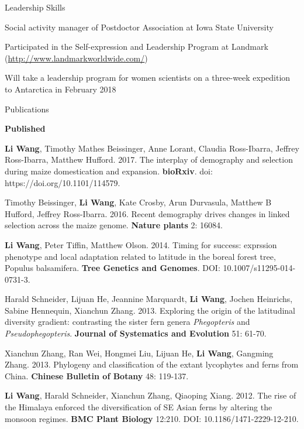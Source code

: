 \documentclass{resume} %
\begin{document}
\begin{rSection}{Leadership Skills}{}{}
\item Social activity manager of Postdoctor Association at Iowa State University
\item Participated in the Self-expression and Leadership Program at Landmark (\url{http://www.landmarkworldwide.com/})
\item Will take a leadership program for women scientists on a three-week expedition to Antarctica in February 2018
\end{rSection}

\begin{rSection}{Publications}{}{}
\begin{rSubsection}{\textbf{Published}}{}{}{}

\item \textbf{Li Wang}, Timothy Mathes Beissinger, Anne Lorant, Claudia Ross-Ibarra, Jeffrey Ross-Ibarra, Matthew Hufford. 2017. The interplay of demography and selection during maize domestication and expansion. \textbf{bioRxiv}. doi: https://doi.org/10.1101/114579. 

\item Timothy Beissinger, \textbf{Li Wang}, Kate Crosby, Arun Durvasula, Matthew B Hufford, Jeffrey Ross-Ibarra. 2016. Recent demography drives changes in linked selection across the maize genome. \textbf{Nature plants} 2: 16084. 

\item \textbf{Li Wang}, Peter Tiffin, Matthew Olson. 2014. Timing for success: exprssion phenotype and local adaptation related to latitude in the boreal forest tree, Populus balsamifera. \textbf{Tree Genetics and Genomes}. DOI: 10.1007/s11295-014-0731-3. 

\item Harald Schneider, Lijuan He, Jeannine Marquardt, \textbf{Li Wang}, Jochen Heinrichs, Sabine Hennequin, Xianchun Zhang. 2013. Exploring the origin of the latitudinal diversity gradient: contrasting the sister fern genera \textit{Phegopteris} and \textit{Pseudophegopteris}. \textbf{Journal of Systematics and Evolution} 51: 61-70.

\item Xianchun Zhang, Ran Wei, Hongmei Liu, Lijuan He, \textbf{Li Wang}, Gangming Zhang. 2013. Phylogeny and classification of the extant lycophytes and ferns from China. \textbf{Chinese Bulletin of Botany} 48: 119-137.


\item \textbf{Li Wang}, Harald Schneider, Xianchun Zhang, Qiaoping Xiang. 2012. The rise of the Himalaya enforced the diversification of SE Asian ferns by altering the monsoon regimes. \textbf{BMC Plant Biology} 12:210. DOI: 10.1186/1471-2229-12-210. 


\end{rSubsection}
\end{rSection}
\end{document}
